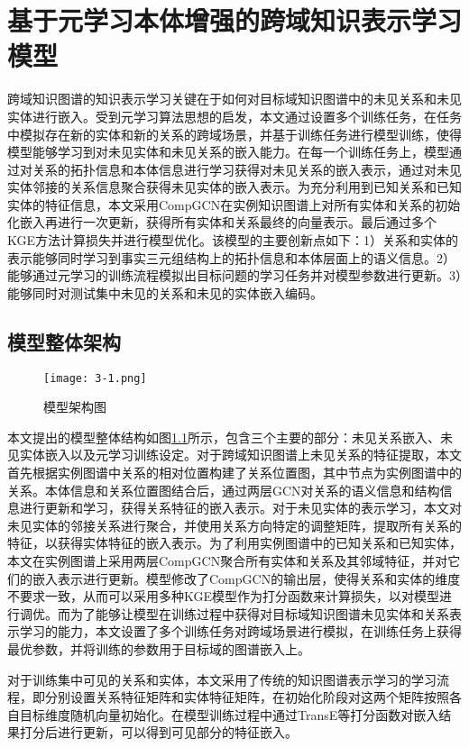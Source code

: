 \chapter{基于元学习本体增强的跨域知识表示学习模型}
跨域知识图谱的知识表示学习关键在于如何对目标域知识图谱中的未见关系和未见实体进行嵌入。受到元学习算法思想的启发，本文通过设置多个训练任务，在任务中模拟存在新的实体和新的关系的跨域场景，并基于训练任务进行模型训练，使得模型能够学习到对未见实体和未见关系的嵌入能力。在每一个训练任务上，模型通过对关系的拓扑信息和本体信息进行学习获得对未见关系的嵌入表示，通过对未见实体邻接的关系信息聚合获得未见实体的嵌入表示。为充分利用到已知关系和已知实体的特征信息，本文采用CompGCN在实例知识图谱上对所有实体和关系的初始化嵌入再进行一次更新，获得所有实体和关系最终的向量表示。最后通过多个KGE方法计算损失并进行模型优化。该模型的主要创新点如下：1）关系和实体的表示能够同时学习到事实三元组结构上的拓扑信息和本体层面上的语义信息。2）能够通过元学习的训练流程模拟出目标问题的学习任务并对模型参数进行更新。3）能够同时对测试集中未见的关系和未见的实体嵌入编码。

\section{模型整体架构}
\begin{figure}[h]
  \centering
  \texttt{[image: 3-1.png]}
  \caption{模型架构图}
  \label{fig:3-1}
\end{figure}

本文提出的模型整体结构如图\ref{fig:3-1}所示，包含三个主要的部分：未见关系嵌入、未见实体嵌入以及元学习训练设定。对于跨域知识图谱上未见关系的特征提取，本文首先根据实例图谱中关系的相对位置构建了关系位置图，其中节点为实例图谱中的关系。本体信息和关系位置图结合后，通过两层GCN对关系的语义信息和结构信息进行更新和学习，获得关系特征的嵌入表示。对于未见实体的表示学习，本文对未见实体的邻接关系进行聚合，并使用关系方向特定的调整矩阵，提取所有关系的特征，以获得实体特征的嵌入表示。为了利用实例图谱中的已知关系和已知实体，本文在实例图谱上采用两层CompGCN聚合所有实体和关系及其邻域特征，并对它们的嵌入表示进行更新。模型修改了CompGCN的输出层，使得关系和实体的维度不要求一致，从而可以采用多种KGE模型作为打分函数来计算损失，以对模型进行调优。而为了能够让模型在训练过程中获得对目标域知识图谱未见实体和关系表示学习的能力，本文设置了多个训练任务对跨域场景进行模拟，在训练任务上获得最优参数，并将训练的参数用于目标域的图谱嵌入上。

对于训练集中可见的关系和实体，本文采用了传统的知识图谱表示学习的学习流程，即分别设置关系特征矩阵和实体特征矩阵，在初始化阶段对这两个矩阵按照各自目标维度随机向量初始化。在模型训练过程中通过TransE等打分函数对嵌入结果打分后进行更新，可以得到可见部分的特征嵌入。

